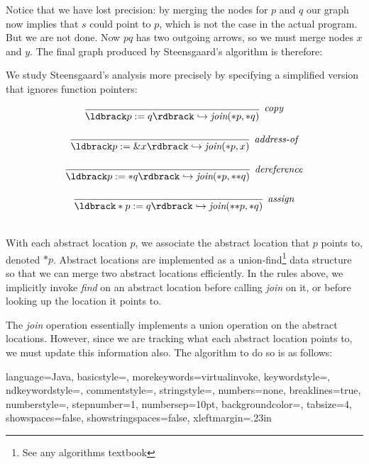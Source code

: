 \documentclass[11pt]{article}
\begin{document}
Notice that we have lost precision: by merging the nodes for $p$ and $q$ our graph now implies that $s$ could point to $p$, which is not the case in the actual program.  But we are not done.  Now $pq$ has two outgoing arrows, so we must merge nodes $x$ and $y$.  The final graph produced by Steensgaard's algorithm is therefore:

\begin{center}
\end{center}

We study Steensgaard's analysis more precisely by specifying
a simplified version that ignores function pointers:

\[
\begin{array}{c}
\infer[\textit{copy}]
	{\parg{p := q} \hookrightarrow \textit{join}(*p,*q)}
	{}\\[3ex]
	
\infer[\textit{address-of}]
	{\parg{p := \&x} \hookrightarrow \textit{join}(*p,x)}
	{}\\[3ex]
	
\infer[\textit{dereference}]
	{\parg{p := *q} \hookrightarrow \textit{join}(*p,*{*}q)}
	{}\\[3ex]
	
\infer[\textit{assign}]
	{\parg{*p := q} \hookrightarrow \textit{join}(*{*}p,*q)}
	{}\\[3ex]
	
\end{array}
\]

With each abstract location $p$, we associate the abstract location that $p$
points to, denoted $*p$. Abstract locations are implemented as a
union-find\footnote{See any algorithms textbook} data structure so that we can
merge two abstract locations efficiently. In the rules above, we implicitly
invoke \textit{find} on an abstract location before calling \textit{join} on it,
or before looking up the location it points to.

The \textit{join} operation essentially implements a union operation on the
abstract locations. However, since we are tracking what each abstract location
points to, we must update this information also. The algorithm to do so is as
follows:

 {
language=Java,
basicstyle=\ttfamily\footnotesize,
  morekeywords={virtualinvoke},
  keywordstyle=\color{blue},
  ndkeywordstyle=\color{red},
  commentstyle=\color{dkred},
  stringstyle=\color{dkgreen},
  numbers=none,
  breaklines=true,
  numberstyle=\ttfamily\footnotesize\color{gray},
  stepnumber=1,
  numbersep=10pt,
  backgroundcolor=\color{white},
  tabsize=4,
  showspaces=false,
  showstringspaces=false,
  xleftmargin=.23in
}
\lstset{style=javastyle}
\end{document}
